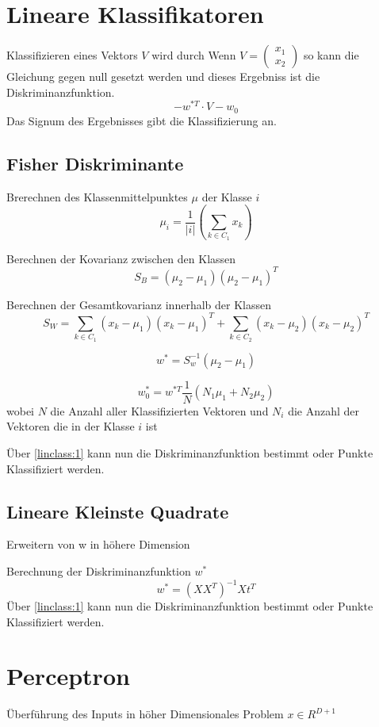 \documentclass{article}
\begin{document}
\section{Lineare Klassifikatoren}

Klassifizieren eines Vektors $V$ wird durch Wenn $V=\begin{pmatrix}
x_1 \\ x_2
\end{pmatrix}$ so kann die Gleichung gegen null gesetzt werden und dieses Ergebniss ist die Diskriminanzfunktion.
\begin{equation} \label{linclass:1}
	- w^{*T} \cdot V - w_0
\end{equation}
Das Signum des Ergebnisses gibt die Klassifizierung an.

\subsection{Fisher Diskriminante}

Brerechnen des Klassenmittelpunktes $\mu$ der Klasse $i$
$$\mu_i = \frac{1}{|i|} (\sum_{k \in C_1}^{} x_k)$$

Berechnen der Kovarianz zwischen den Klassen 
$$
S_{B} = (\mu_{2} - \mu_{1})(\mu_{2} - \mu_{1})^T
$$

Berechnen der Gesamtkovarianz innerhalb der Klassen
$$ S_{W} = \sum_{k \in C_1}^{}  (x_k - \mu_{1})(x_k - \mu_{1})^T +
\sum_{k \in C_2}^{}  (x_k - \mu_{2})(x_k - \mu_{2})^T
 $$
 


$$w^* = S_{w}^{-1}(\mu_{2} - \mu_{1}) $$

$$ w_{0}^* = w^{*T} \frac{1}{N} (N_{1} \mu_{1} + N_2 \mu_{2}) $$
wobei $N$ die Anzahl aller Klassifizierten Vektoren und $N_i$ die Anzahl der Vektoren die in der Klasse $i$ ist

Über \ref{linclass:1} kann nun die Diskriminanzfunktion bestimmt oder Punkte Klassifiziert werden.

\subsection{Lineare Kleinste Quadrate}

Erweitern von w in höhere Dimension

Berechnung der Diskriminanzfunktion $w^*$
$$ w^* = (X X^T)^{-1}X t^T $$
Über \ref{linclass:1} kann nun die Diskriminanzfunktion bestimmt oder Punkte Klassifiziert werden.

\section{Perceptron}
Überführung des Inputs in höher Dimensionales Problem $x \in \!R^{D+1}$
\end{document}
